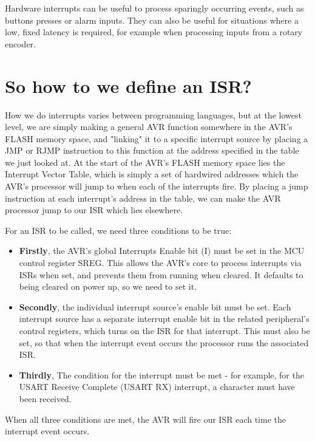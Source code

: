 \documentclass[a4paper,oneside,notitlepage]{book}
\begin{document}
Hardware interrupts can be useful to process sparingly occurring events, such as buttons presses or alarm inputs. They can also be useful for situations where a low, fixed latency is required, for example when processing inputs from a rotary encoder.


\label{chp:DefISR}
\chapter{So how to we define an ISR?}

How we do interrupts varies between programming languages, but at the lowest level, we are simply making a general AVR function somewhere in the AVR's FLASH memory space, and "linking" it to a specific interrupt source by placing a JMP or RJMP instruction to this function at the address specified in the table we just looked at. At the start of the AVR's FLASH memory space lies the Interrupt Vector Table, which is simply a set of hardwired addresses which the AVR's processor will jump to when each of the interrupts fire. By placing a jump instruction at each interrupt's address in the table, we can make the AVR processor jump to our ISR which lies elsewhere.

For an ISR to be called, we need three conditions to be true: 

\begin{itemize}
\item \textbf{Firstly}, the AVR's global Interrupts Enable bit (I) must be set in the MCU control register SREG. This allows the AVR's core to process interrupts via ISRs when set, and prevents them from running when cleared. It defaults to being cleared on power up, so we need to set it.

\item \textbf{Secondly}, the individual interrupt source's enable bit must be set. Each interrupt source has a separate interrupt enable bit in the related peripheral's control registers, which turns on the ISR for that interrupt. This must also be set, so that when the interrupt event occurs the processor runs the associated ISR.

\item \textbf{Thirdly}, The condition for the interrupt must be met - for example, for the USART Receive Complete (USART RX) interrupt, a character must have been received. 
\end{itemize}

When all three conditions are met, the AVR will fire our ISR each time the interrupt event occurs.
\end{document}
